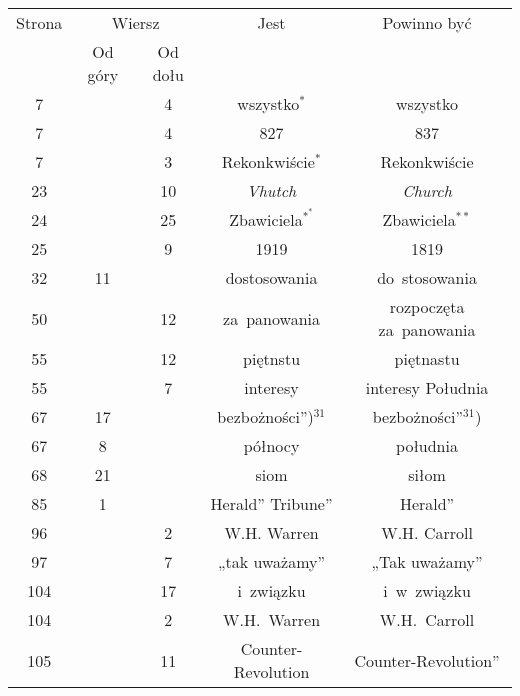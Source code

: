 \documentclass[a4paper,11pt]{article}
\begin{document}
\VerSpaceFour





\newpage



\begin{center}

  \begin{tabular}{|c|c|c|c|c|}
    \hline
    Strona & \multicolumn{2}{c|}{Wiersz} & Jest
                              & Powinno być \\ \cline{2-3}
    & Od góry & Od dołu & & \\
    \hline
    \hphantom{00}7 & & \hphantom{0}4 & wszystko$^{ * }$ & wszystko \\
    \hphantom{00}7 & & \hphantom{0}4 & 827 & 837 \\
    \hphantom{00}7 & & \hphantom{0}3 & Rekonkwiście$^{ * }$
    & Rekonkwiście \\
    \hphantom{0}23 & & 10 & \textit{Vhutch} & \textit{Church} \\
    \hphantom{0}24 & & 25 & Zbawiciela$^{ *^{ * } }$ & Zbawiciela$^{ ** }$ \\
    \hphantom{0}25 & & \hphantom{0}9 & 1919 & 1819 \\
    \hphantom{0}32 & 11 & & dostosowania & do~stosowania \\
    \hphantom{0}50 & & 12 & za~panowania & rozpoczęta za~panowania \\
    \hphantom{0}55 & & 12 & piętnstu & piętnastu \\
    \hphantom{0}55 & &  7 & interesy & interesy Południa \\
    \hphantom{0}67 & 17 & & bezbożności”)$^{ 31 }$
    & bezbożności”$^{ 31 }$) \\
    \hphantom{0}67 & \hphantom{0}8 & & północy & południa \\
    \hphantom{0}68 & 21 & & siom & siłom \\
    \hphantom{0}85 & \hphantom{0}1 & & Herald” Tribune” & Herald” \\
    \hphantom{0}96 & & \hphantom{0}2 & W.H. Warren & W.H. Carroll \\
    \hphantom{0}97 & & \hphantom{0}7 & „tak uważamy” & „Tak uważamy” \\
    104 & & 17 & i~związku & i~w~związku \\
    104 & & \hphantom{0}2 & W.H.~Warren & W.H.~Carroll \\
    105 & & 11 & Counter-Revolution & Counter-Revolution” \\

\end{tabular}
\end{center}
\end{document}
